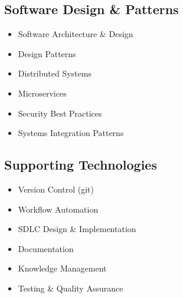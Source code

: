 \subsection{Software Design \& Patterns}
\begin{itemize}
    \item Software Architecture \& Design
    \item Design Patterns
    \item Distributed Systems
    \item Microservices
    \item Security Best Practices
    \item Systems Integration Patterns
\end{itemize}

\subsection{Supporting Technologies}
\begin{itemize}
    \item Version Control (git)
    \item Workflow Automation
    \item SDLC Design \& Implementation
    \item Documentation
    \item Knowledge Management
    \item Testing \& Quality Assurance
\end{itemize}
